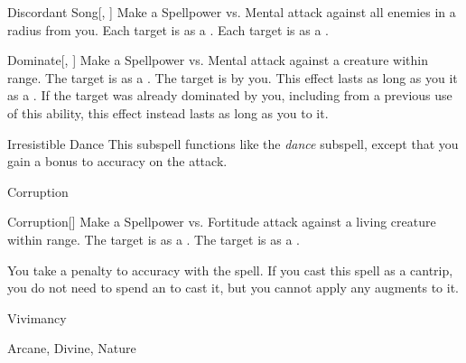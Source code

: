 \begin{ability}[\nth{5}]{Discordant Song}[, ]
Make a Spellpower vs. Mental attack against all enemies in a \areamed radius from you.
\hit Each target is \disoriented as a .
\crit Each target is \confused as a .
\end{ability}
\vspace{0.25em}


\begin{ability}[\nth{5}]{Dominate}[, ]
Make a Spellpower vs. Mental attack against a creature within \rngmed range.
\hit The target is  as a .
\crit The target is  by you.
This effect lasts as long as you  it as a .
If the target was already dominated by you, including from a previous use of this ability, this effect instead lasts as long as you  to it.
\end{ability}
\vspace{0.25em}


\begin{ability}[\nth{8}]{Irresistible Dance}
This subspell functions like the \textit{dance} subspell, except that you gain a  bonus to accuracy on the attack.
\end{ability}
\vspace{0.25em}

\newpage
\begin{spellsection}{Corruption}

\begin{spellheader}
\end{spellheader}


\begin{ability}{Corruption}[]
Make a Spellpower vs. Fortitude attack against a living creature within \rngclose range.
\hit The target is  as a .
\crit The target is  as a .
\end{ability}



You take a  penalty to accuracy with the spell.
If you cast this spell as a cantrip,
you do not need to spend an  to cast it,
but you cannot apply any augments to it.


 Vivimancy

 Arcane, Divine, Nature
\end{spellsection}


